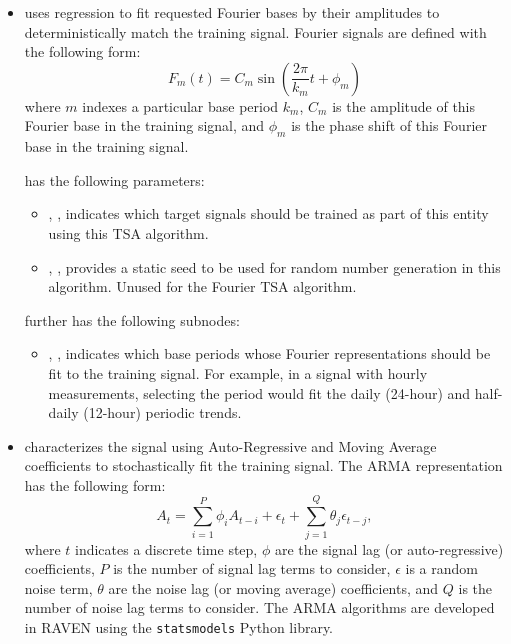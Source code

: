 {\begin{itemize}
   has the following subnodes:
  \begin{itemize}
  \item {}, , indicates which
    degree of polynomial to fit to the presented data.
  \end{itemize}

  \item {} uses regression to fit requested Fourier bases by their amplitudes to
    deterministically match the training signal. Fourier signals are defined with the following form:
    \begin{equation*}
      F_m(t) = C_m\sin\left( \frac{2\pi}{k_m}t + \phi_m\right)
    \end{equation*}
    where $m$ indexes a particular base period $k_m$, $C_m$ is the amplitude of this Fourier base in the
    training signal, and $\phi_m$ is the phase shift of this Fourier base in the training signal.

     has the following parameters:
    \begin{itemize}
      \item {}, , indicates which
        target signals should be trained as part of this entity using this TSA algorithm.
      \item {}, , provides a static seed to be used for
        random number generation in this algorithm. Unused for the Fourier TSA algorithm.
    \end{itemize}
     further has the following subnodes:
    \begin{itemize}
      \item {}, , indicates which base
        periods whose Fourier representations should be fit to the training signal. For example, in
        a signal with hourly measurements, selecting the period  would fit the daily
        (24-hour) and half-daily (12-hour) periodic trends.
    \end{itemize}

  \item {} characterizes the signal using Auto-Regressive and Moving Average
    coefficients to stochastically fit the training signal.
    The ARMA representation has the following form:
    \begin{equation*}
      A_t = \sum_{i=1}^P \phi_i A_{t-i} + \epsilon_t + \sum_{j=1}^Q \theta_j \epsilon_{t-j},
    \end{equation*}
    where $t$ indicates a discrete time step, $\phi$ are the signal lag (or auto-regressive)
    coefficients, $P$ is the number of signal lag terms to consider, $\epsilon$ is a random noise
    term, $\theta$ are the noise lag (or moving average) coefficients, and $Q$ is the number of
    noise lag terms to consider. The ARMA algorithms are developed in RAVEN using the
    \texttt{statsmodels} Python library.


\end{itemize}}
